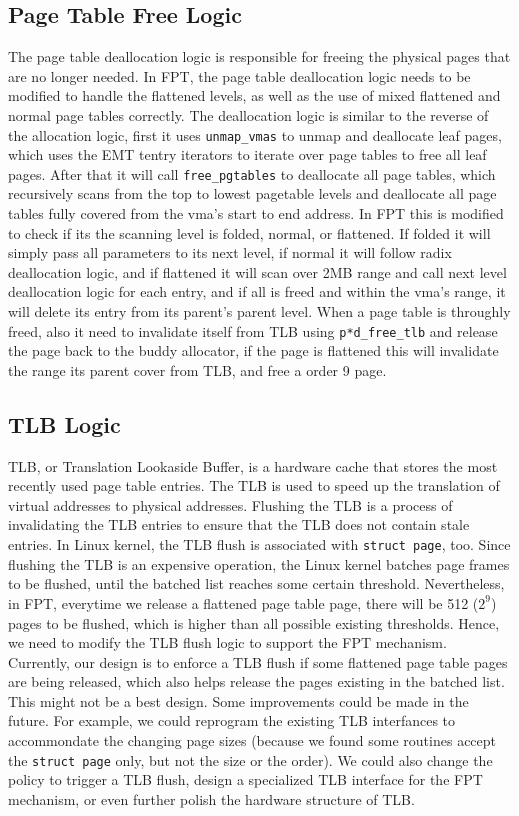 \subsection{Page Table Free Logic}

The page table deallocation logic is responsible for freeing the physical pages that are no longer needed. In FPT, the page table deallocation logic needs to be modified to handle the flattened levels, as well as the use of mixed flattened and normal page tables correctly. The deallocation logic is similar to the reverse of the allocation logic, first it uses \lstinline|unmap_vmas| to unmap and deallocate leaf pages, which uses the EMT tentry iterators to iterate over page tables to free all leaf pages. After that it will call \lstinline|free_pgtables| to deallocate all page tables, which recursively scans from the top to lowest pagetable levels and deallocate all page tables fully covered from the vma's start to end address. In FPT this is modified to check if its the scanning level is folded, normal, or flattened. If folded it will simply pass all parameters to its next level, if normal it will follow radix deallocation logic, and if flattened it will scan over 2MB range and call next level deallocation logic for each entry, and if all is freed and within the vma's range, it will delete its entry from its parent's parent level. When a page table is throughly freed, also it need to invalidate itself from TLB using \lstinline|p*d_free_tlb| and release the page back to the buddy allocator, if the page is flattened this will invalidate the range its parent cover from TLB, and free a order 9 page.

\subsection{TLB Logic}

TLB, or Translation Lookaside Buffer, is a hardware cache that stores the most recently used page table entries. The TLB is used to speed up the translation of virtual addresses to physical addresses. Flushing the TLB is a process of invalidating the TLB entries to ensure that the TLB does not contain stale entries. In Linux kernel, the TLB flush is associated with \lstinline|struct page|, too. Since flushing the TLB is an expensive operation, the Linux kernel batches page frames to be flushed, until the batched list reaches some certain threshold. Nevertheless, in FPT, everytime we release a flattened page table page, there will be 512 ($2^9$) pages to be flushed, which is higher than all possible existing thresholds. Hence, we need to modify the TLB flush logic to support the FPT mechanism. Currently, our design is to enforce a TLB flush if some flattened page table pages are being released, which also helps release the pages existing in the batched list. This might not be a best design. Some improvements could be made in the future. For example, we could reprogram the existing TLB interfances to accommondate the changing page sizes (because we found some routines accept the \lstinline|struct page| only, but not the size or the order). We could also change the policy to trigger a TLB flush, design a specialized TLB interface for the FPT mechanism, or even further polish the hardware structure of TLB.

